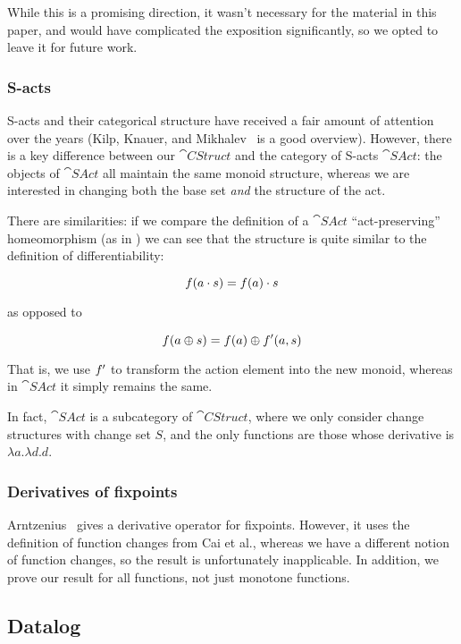 While this is a promising direction, it wasn't necessary for the material in
this paper, and would have complicated the exposition significantly, so we opted
to leave it for future work.

\subsubsection{S-acts}

S-acts and their categorical structure have received a fair amount of attention
over the years (Kilp, Knauer, and Mikhalev~\cite{kilp2000monoids} is a good
overview). However, there is a key difference between our $\cat{CStruct}$ and the category of
S-acts $\cat{SAct}$: the objects of $\cat{SAct}$ all maintain the same monoid
structure, whereas we are interested in changing both the base set \emph{and} the structure of the act.

There are similarities: if we compare the definition of a $\cat{SAct}$ ``act-preserving''
homeomorphism (as in \cite{kilp2000monoids}) we can see that the structure is
quite similar to the definition of differentiability:

$$f(a \cdot s) = f(a) \cdot s$$

as opposed to

$$f(a \oplus s) = f(a) \oplus f'(a, s)$$

That is, we use $f'$ to transform the action element into the new
monoid, whereas in $\cat{SAct}$ it simply remains the same.

In fact, $\cat{SAct}$ is a subcategory of $\cat{CStruct}$, where we only
consider change structures with change set $S$, and the only functions are those
whose derivative is $\lambda a. \lambda d. d$.

\subsubsection{Derivatives of fixpoints}

Arntzenius~\cite{arntz2017fixpoints} gives a derivative operator for fixpoints. However,
it uses the definition of function changes from Cai et al., whereas
we have a different notion of function changes, so the result is unfortunately
inapplicable. In addition, we prove our result for all functions, not just
monotone functions.

\subsection{Datalog}

